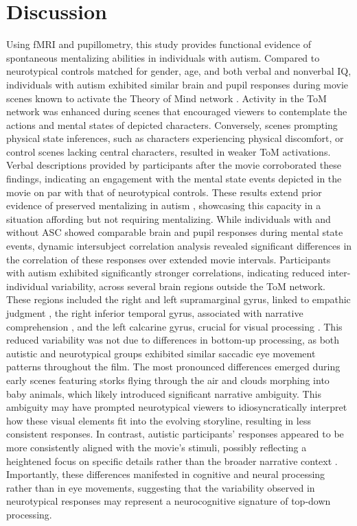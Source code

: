

\section*{Discussion}
Using fMRI and pupillometry, this study provides functional evidence of spontaneous mentalizing abilities in individuals with autism. Compared to neurotypical controls matched for gender, age, and both verbal and nonverbal IQ, individuals with autism exhibited similar brain and pupil responses during movie scenes known to activate the Theory of Mind network \citep{jacoby2016,richardson2018}. Activity in the ToM network was enhanced during scenes that encouraged viewers to contemplate the actions and mental states of depicted characters. Conversely, scenes prompting physical state inferences, such as characters experiencing physical discomfort, or control scenes lacking central characters, resulted in weaker ToM activations. Verbal descriptions provided by participants after the movie corroborated these findings, indicating an engagement with the mental state events depicted in the movie on par with that of neurotypical controls. These results extend prior evidence of preserved mentalizing in autism \citep{moessnang2020,dufour2013}, showcasing this capacity in a situation affording but not requiring mentalizing.
While individuals with and without ASC showed comparable brain and pupil responses during mental state events, dynamic intersubject correlation analysis revealed significant differences in the correlation of these responses over extended movie intervals. Participants with autism exhibited significantly stronger correlations, indicating reduced inter-individual variability, across several brain regions outside the ToM network. These regions included the right and left supramarginal gyrus, linked to empathic judgment \citep{silani2013,wada2021}, the right inferior temporal gyrus, associated with narrative comprehension \citep{youssofzadeh2022}, and the left calcarine gyrus, crucial for visual processing \citep{woldorff2002}. This reduced variability was not due to differences in bottom-up processing, as both autistic and neurotypical groups exhibited similar saccadic eye movement patterns throughout the film. The most pronounced differences emerged during early scenes featuring storks flying through the air and clouds morphing into baby animals, which likely introduced significant narrative ambiguity. This ambiguity may have prompted neurotypical viewers to idiosyncratically interpret how these visual elements fit into the evolving storyline, resulting in less consistent responses. In contrast, autistic participants' responses appeared to be more consistently aligned with the movie's stimuli, possibly reflecting a heightened focus on specific details rather than the broader narrative context \citep{losh2003,tager-flusberg1995,barnes2012,geelhand2020,koldewyn2014}. Importantly, these differences manifested in cognitive and neural processing rather than in eye movements, suggesting that the variability observed in neurotypical responses may represent a neurocognitive signature of top-down processing.
